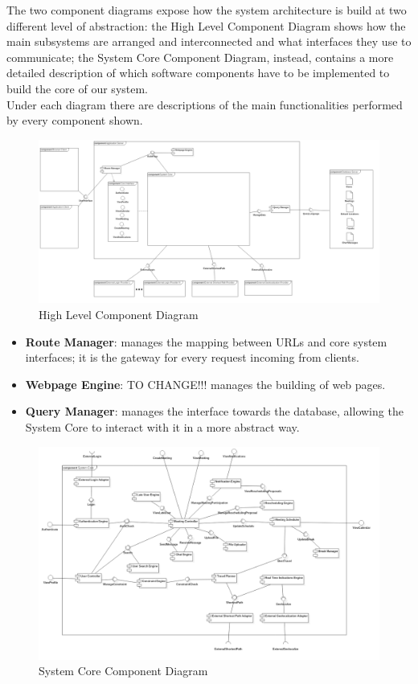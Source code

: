 The two component diagrams expose how the system architecture is build at two different level of abstraction: the High Level Component Diagram shows how the main subsystems are arranged and interconnected and what interfaces they use to communicate; the System Core Component Diagram, instead, contains a more detailed description of which software components have to be implemented to build the core of our system.\\
Under each diagram there are descriptions of the main functionalities performed by every component shown.

\begin{figure}[!h]
\centering\includegraphics[width=\textwidth]{Images/UMLDiagrams/HighLevelComponentDiagram.png}
\caption{High Level Component Diagram}
\end{figure}

\begin{itemize}
\item \textbf{Route Manager}: manages the mapping between URLs and core system interfaces; it is the gateway for every request incoming from clients.
\item \textbf{Webpage Engine}: TO CHANGE!!! manages the building of web pages.
\item \textbf{Query Manager}: manages the interface towards the database, allowing the System Core to interact with it in a more abstract way.
\end{itemize}

\begin{figure}[!h]
\centering\includegraphics[width=\textwidth]{Images/UMLDiagrams/ApplicationComponentDiagram.png}
\caption{System Core Component Diagram}
\end{figure}

